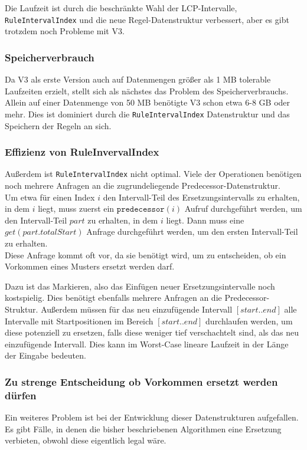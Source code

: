 Die Laufzeit ist durch die beschränkte Wahl der LCP-Intervalle, \texttt{RuleIntervalIndex} und die neue Regel-Datenstruktur verbessert, aber es gibt trotzdem noch Probleme mit V3. 

\subsubsection{Speicherverbrauch}
Da V3 als erste Version auch auf Datenmengen größer als 1 MB tolerable Laufzeiten erzielt, stellt sich als nächstes das Problem des Speicherverbrauchs. Allein auf einer Datenmenge von 50 MB benötigte V3 schon etwa 6-8 GB oder mehr. Dies ist dominiert durch die \texttt{RuleIntervalIndex} Datenstruktur und das Speichern der Regeln an sich.

\subsubsection{Effizienz von RuleInvervalIndex}

Außerdem ist \texttt{RuleIntervalIndex} nicht optimal. Viele der Operationen benötigen noch mehrere Anfragen an die zugrundeliegende Predecessor-Datenstruktur.\\
Um etwa für einen Index $i$ den Intervall-Teil des Ersetzungsintervalls zu erhalten, in dem $i$ liegt, muss zuerst ein $\texttt{predecessor}(i)$ Aufruf durchgeführt werden, um den Intervall-Teil $part$ zu erhalten, in dem $i$ liegt. Dann muss eine $get(part.totalStart)$ Anfrage durchgeführt werden, um den ersten Intervall-Teil zu erhalten.\\
Diese Anfrage kommt oft vor, da sie benötigt wird, um zu entscheiden, ob ein Vorkommen eines Musters ersetzt werden darf.

Dazu ist das Markieren, also das Einfügen neuer Ersetzungsintervalle noch kostspielig. Dies benötigt ebenfalls mehrere Anfragen an die Predecessor-Struktur. Außerdem müssen für das neu einzufügende Intervall $[start.. end]$ alle Intervalle mit Startpositionen im Bereich $[start.. end]$ durchlaufen werden, um diese potenziell zu ersetzen, falls diese weniger tief verschachtelt sind, als das neu einzufügende Intervall. Dies kann im Worst-Case lineare Laufzeit in der Länge der Eingabe bedeuten.

\subsubsection{Zu strenge Entscheidung ob Vorkommen ersetzt werden dürfen}
\label{strictdecision}
Ein weiteres Problem ist bei der Entwicklung dieser Datenstrukturen aufgefallen. Es gibt Fälle, in denen die bisher beschriebenen Algorithmen eine Ersetzung verbieten, obwohl diese eigentlich legal wäre.

